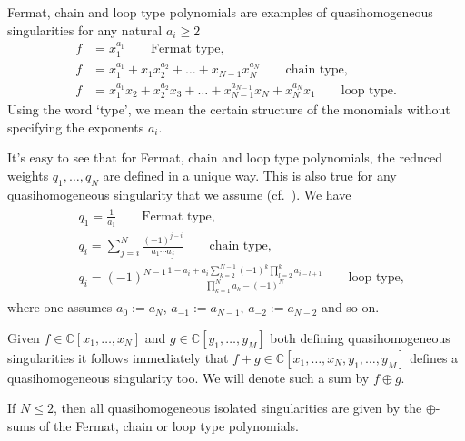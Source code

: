 \documentclass[10pt,a4paper]{amsart}
\numberwithin{equation}{section}
\newcommand{\CC}{{\mathbb{C}}}
\begin{document}
\begin{Example}
 Fermat, chain and loop type polynomials are examples of quasihomogeneous singularities for any natural $a_i \ge 2$
 \begin{align*}
	 f &= x_1^{a_1} \qquad \text{Fermat type},
	 \\
	 f &= x_1^{a_1} + x_1 x_2^{a_2} + \dots + x_{N-1} x_N^{a_N} \qquad \text{chain type},
	 \\
	 f &= x_1^{a_1}x_2 + x_2^{a_2}x_3 + \dots + x_{N-1}^{a_{N-1}}x_N + x_N^{a_N}x_1 \qquad \text{loop type}.
 \end{align*}
 Using the word `type', we mean the certain structure of the monomials without specifying the exponents $a_i$.
\end{Example}

It's easy to see that for Fermat, chain and loop type polynomials, the reduced weights $q_1,\dots,q_N$ are defined in a unique way. This is also true for any quasihomogeneous singularity that we assume (cf.\ \cite[Korollar~1.7]{S71}). We have
\begin{align*}
\begin{split}
 & q_1 = \frac{1}{a_1} \qquad \text{Fermat type,}
 \\
 & q_i = \sum_{j=i}^N\frac{(-1)^{j-i}}{a_1\cdots a_j} \qquad \text{chain type,}
 \\
 & q_i = (-1)^{N-1}\frac{1 - a_i + a_i \sum_{k=2}^{N-1} (-1)^k \prod_{l=2}^k a_{i-l+1}}{\prod_{k=1}^N a_k - (-1)^N} \qquad \text{loop type,}
 \end{split}
\end{align*}
where one assumes $a_0 := a_N$, $a_{-1} := a_{N-1}$, $a_{-2} := a_{N-2}$ and so on.


Given $f \in \CC[x_1,\dots,x_N]$ and $g \in \CC[y_1,\dots,y_M]$ both defining quasihomogeneous singularities it follows immediately that $f+g \in \CC[x_1,\dots,x_N,y_1,\dots,y_M]$ defines a quasihomogeneous singularity too. We will denote such a sum by $f \oplus g$.

\begin{Example}
If $N \le 2$, then all quasihomogeneous isolated singularities are given by the $\oplus$-sums of the Fermat, chain or loop type polynomials.
\end{Example}
\end{document}
